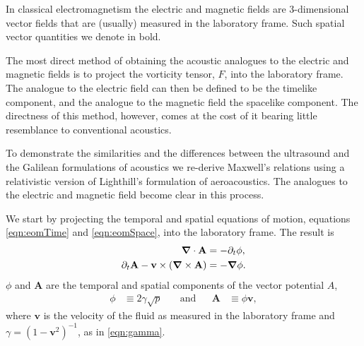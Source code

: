 \documentclass[10pt, fleqn,final,showtrims,oldfontcommands, article,a4paper,oneside]{memoir} %
\newcommand{\sub}[1]{\begin{subequations}#1\end{subequations}}
\newcommand{\eqnref}[1]{\ref{eqn:#1}}
\newcommand{\lr}[1]{\left( #1 \right)}
\renewcommand{\d}{\partial}
\newcommand{\del}{\nabla}
\newcommand{\vdel}{ \mbox{\boldmath $\del$}}
\newcommand{\dt}{{\d_t}}
\newcommand{\g}{\gamma_0}
\newcommand{\vA}{\textbf{A}}
\newcommand{\vv}{\textbf{v}}
\begin{document}
In classical electromagnetism the electric and magnetic fields are 
3-dimensional vector fields that are (usually) measured  in the laboratory frame.
Such spatial vector quantities we denote in bold.

The most direct method of obtaining the acoustic analogues to the electric and magnetic fields
 is to project the vorticity tensor, $F$, into the laboratory  frame\cite{Hestenes2003, Doran2003}.
The analogue to the electric field can then be defined to be the timelike component, and the analogue to the magnetic field the spacelike component.
The directness of this method, however, comes at the cost of it bearing little  resemblance to conventional acoustics.

To demonstrate the similarities and the differences between  the ultrasound and the Galilean  formulations of acoustics
we re-derive Maxwell's relations using a relativistic version of Lighthill's formulation of aeroacoustics\cite{Lighthill1952}.
The analogues to the electric and magnetic field  become clear in this process.

We start  by projecting the temporal and spatial equations of motion, equations \eqnref{eomTime} and \eqnref{eomSpace},
into the laboratory frame.
The result is
\sub{
  \begin{align}
     \vdel \cdot \vA &=  - \dt \phi, \label{eqn:Rcontinuity}\\ %
\dt \vA - \vv \times  \lr{\vdel \times \vA} \label{eqn:REuler}
&= - \vdel \phi.
  \end{align}
}
$\phi$ and $\vA$ are the temporal and spatial components of the vector potential $A$,
\begin{align}
\phi &\equiv  2\gamma \sqrt {p}   %
& \quad\text{and} &&
\vA &\equiv  \phi \vv,  %
 \end{align}
where $\vv$ is the velocity  of the fluid as measured in the laboratory frame and 
 $\gamma = (1-\vv^2)^{-1}$, as in \eqnref{gamma}.
\end{document}
